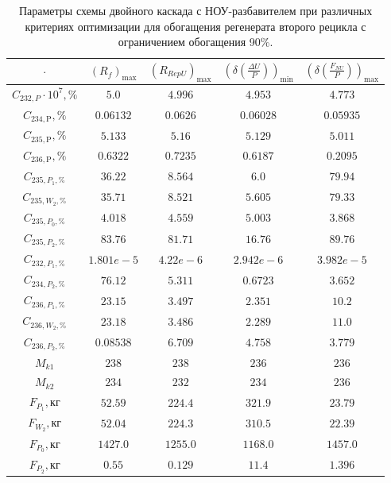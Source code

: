 \begin{table}
    \begin{tabular}{ccccc}
    $\cdot$ & $(R_f)_\text{max}$ & $(R_{RepU})_\text{max}$ & $(\delta(\frac{\Delta U}{P}))_\text{min}$ & $(\delta(\frac{F_{NU}}{P}))_\text{max}$\\ \hline
    $C_{232,P}\cdot10^{7}, \%$ & $5.0$ & $4.996$ & $4.953$ & $4.773$\\ \hline
    $C_{234,\text{P}}, \%$ & $0.06132$ & $0.0626$ & $0.06028$ & $0.05935$\\ \hline
    $C_{235,\text{P}}, \%$ & $5.133$ & $5.16$ & $5.129$ & $5.011$\\ \hline
    $C_{236,\text{P}}, \%$ & $0.6322$ & $0.7235$ & $0.6187$ & $0.2095$\\ \hline
    $C_{235,P_1, \%}$ & $36.22$ & $8.564$ & $6.0$ & $79.94$\\ \hline
    $C_{235,W_2, \%}$ & $35.71$ & $8.521$ & $5.605$ & $79.33$\\ \hline
    $C_{235,P_0, \%}$ & $4.018$ & $4.559$ & $5.003$ & $3.868$\\ \hline
    $C_{235,P_2, \%}$ & $83.76$ & $81.71$ & $16.76$ & $89.76$\\ \hline
    $C_{232,P_1, \%}$ & $1.801e-5$ & $4.22e-6$ & $2.942e-6$ & $3.982e-5$\\ \hline
    $C_{234,P_2, \%}$ & $76.12$ & $5.311$ & $0.6723$ & $3.652$\\ \hline
    $C_{236,P_1, \%}$ & $23.15$ & $3.497$ & $2.351$ & $10.2$\\ \hline
    $C_{236,W_2, \%}$ & $23.18$ & $3.486$ & $2.289$ & $11.0$\\ \hline
    $C_{236,P_2, \%}$ & $0.08538$ & $6.709$ & $4.758$ & $3.779$\\ \hline
    $M_{k1}$ & $238$ & $238$ & $236$ & $236$\\ \hline
    $M_{k2}$ & $234$ & $232$ & $234$ & $236$\\ \hline
    $F_{P_1}, \text{кг}$ & $52.59$ & $224.4$ & $321.9$ & $23.79$\\ \hline
    $F_{W_2}, \text{кг}$ & $52.04$ & $224.3$ & $310.5$ & $22.39$\\ \hline
    $F_{P_0}, \text{кг}$ & $1427.0$ & $1255.0$ & $1168.0$ & $1457.0$\\ \hline
    $F_{P_2}, \text{кг}$ & $0.55$ & $0.129$ & $11.4$ & $1.396$\\ \hline
\end{tabular}
\caption{Параметры схемы двойного каскада с НОУ-разбавителем при различных критериях оптимизации для обогащения регенерата второго рецикла с ограничением обогащения 90\%.{\label{2opt2_90}}}
\end{table}

